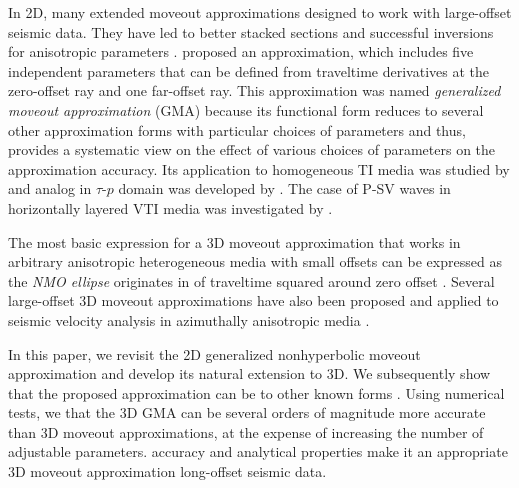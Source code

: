 In 2D, many extended moveout approximations  designed to work with large-offset seismic data. They have led to better stacked sections and successful inversions for anisotropic parameters \cite[e.g.][]{hake, castle,tsvankinthomsen1994,alkatsvankin,alkavti,pech2003,fomel,taner2005,ursin,blias2009,aleixo,golikov,blias2013}. \cite{fomelstovas} proposed an approximation, which includes five independent parameters that can be defined from traveltime derivatives at the zero-offset ray and one far-offset ray. This approximation was named \textit{generalized moveout approximation} (GMA) because its functional form reduces to several other  approximation forms with particular choices of parameters and thus, provides a systematic view on the effect of various choices of parameters on the approximation accuracy. Its application to homogeneous TI media was studied by \cite{stovas2010} and  analog in $\tau$-$p$ domain was developed by \cite{stovasfomel}. The case of P-SV waves in horizontally layered VTI media was investigated by \cite{haolayered}.

The most basic expression for a 3D moveout approximation that works in arbitrary anisotropic heterogeneous media with small offsets can be expressed as the \textit{NMO ellipse}  originates in  of traveltime squared around zero offset \cite[]{nmoellipse,tsvankin2011book}. Several large-offset 3D moveout approximations have also been proposed and applied to seismic velocity analysis in azimuthally anisotropic media \cite[]{alhti,alortho,pech2004,xu,vascon,grechkapech,fpj}. 

In this paper, we revisit the 2D generalized nonhyperbolic moveout approximation and develop its natural extension to 3D. We subsequently show that the proposed approximation can be  to other known forms . Using numerical tests, we  that the 3D GMA can be several orders of magnitude more accurate than  3D moveout approximations, at the expense of increasing the number of adjustable parameters.  accuracy and analytical properties  make it an appropriate  3D moveout approximation  long-offset seismic data.

